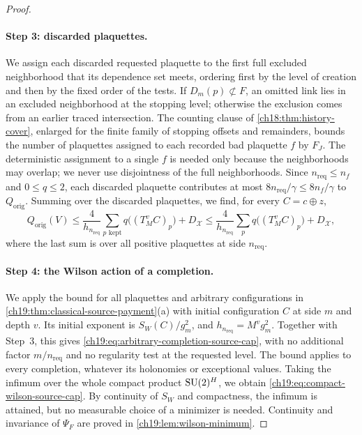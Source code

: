 \begin{proof}
\paragraph{Step 3: discarded plaquettes.}
We assign each discarded requested plaquette to the first full excluded neighborhood that its dependence set meets, ordering first by the level of creation and then by the fixed order of the tests. If $D_m(p)\not\subset F$, an omitted link lies in an excluded neighborhood at the stopping level; otherwise the exclusion comes from an earlier traced intersection. The counting clause of \cref{ch18:thm:history-cover}, enlarged for the finite family of stopping offsets and remainders, bounds the number of plaquettes assigned to each recorded bad plaquette $f$ by $F_J$. The deterministic assignment to a single $f$ is needed only because the neighborhoods may overlap; we never use disjointness of the full neighborhoods. Since $n_{\mathrm{req}}\le n_f$ and $0\le q\le2$, each discarded plaquette contributes at most $8n_{\mathrm{req}}/\gamma\le8n_f/\gamma$ to $Q_{\mathrm{orig}}$. Summing over the discarded plaquettes, we find, for every $C=c\oplus z$,
\[
 Q_{\mathrm{orig}}(V)\le\frac4{h_{n_{\mathrm{req}}}}\sum_{p\text{ kept}}q\bigl((T_M^vC)_p\bigr)+D_{\mathcal X}
 \le\frac4{h_{n_{\mathrm{req}}}}\sum_pq\bigl((T_M^vC)_p\bigr)+D_{\mathcal X},
\]
where the last sum is over all positive plaquettes at side $n_{\mathrm{req}}$.

\paragraph{Step 4: the Wilson action of a completion.}
We apply the bound for all plaquettes and arbitrary configurations in \cref{ch19:thm:classical-source-payment}(a) with initial configuration $C$ at side $m$ and depth $v$. Its initial exponent is $S_W(C)/g_m^2$, and $h_{n_{\mathrm{req}}}=M^vg_m^2$. Together with Step~3, this gives \eqref{ch19:eq:arbitrary-completion-source-cap}, with no additional factor $m/n_{\mathrm{req}}$ and no regularity test at the requested level. The bound applies to every completion, whatever its holonomies or exceptional values. Taking the infimum over the whole compact product $\mathrm{SU}(2)^H$, we obtain \eqref{ch19:eq:compact-wilson-source-cap}. By continuity of $S_W$ and compactness, the infimum is attained, but no measurable choice of a minimizer is needed. Continuity and invariance of $\Psi_F$ are proved in \cref{ch19:lem:wilson-minimum}.


\end{proof}
